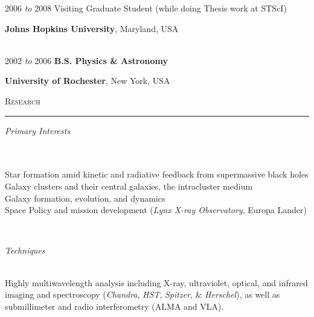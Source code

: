 \documentclass[11pt]{article}
\makeatletter
\def\vhrulefill#1{\leavevmode\leaders\hrule\@height#1\hfill \kern\z@}
\makeatother
\begin{document}
\hspace{2.5mm}2006 \textit{to} 2008  \hspace{18mm} Visiting Graduate Student (while doing Thesis work at STScI)

\hspace{42mm} \parbox{5.15in}{\textbf{Johns Hopkins University}, Maryland, USA} \\



\hspace{2.5mm} 2002 \textit{to} 2006 \hspace{17mm} {\textbf{B.S. Physics \& Astronomy}}

\hspace{42mm} \parbox{5.15in}{\textbf{University of Rochester}, New York, USA}



\textsc{Research}  \vhrulefill{0.4pt}

\vspace{2mm}

\hspace{2.5mm} \parbox{1.5in}{\textit{Primary Interests \\\\\\}} \parbox{5.15in}{Star formation amid kinetic and radiative feedback from supermassive black holes \\ Galaxy clusters and their central galaxies, the intracluster medium \\ Galaxy formation, evolution, and dynamics \\ Space Policy and mission development (\textit{Lynx X-ray Observatory}, Europa Lander)} \\


\vspace{3mm}


\hspace{2.5mm} \parbox{1.5in}{\textit{Techniques \\\\}} \parbox{5.15in}{Highly multiwavelength analysis including X-ray, ultraviolet, optical, and infrared imaging and spectroscopy (\textit{Chandra}, \textit{HST}, \textit{Spitzer}, \& \textit{Herschel}), as well as submillimeter and radio interferometry (ALMA and VLA).  } \\
\end{document}
